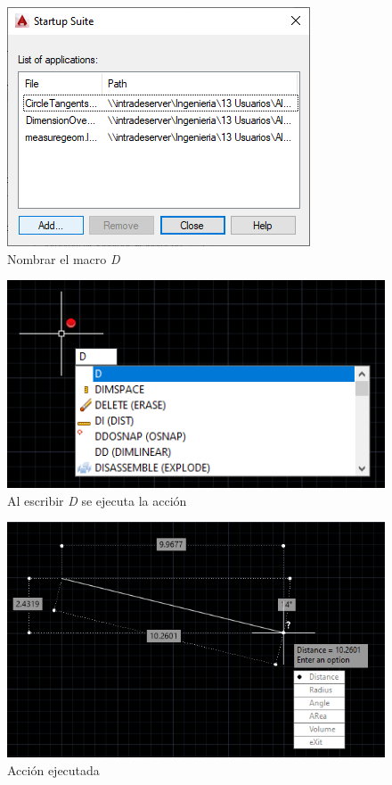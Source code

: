 \documentclass{report}
\begin{document}
\begin{figure}[H]
	\centering
	\includegraphics[width=0.75\linewidth, height=0.45\textheight,keepaspectratio]{Imagenes/autocad_measuregeom03}
	\caption{Nombrar el macro \emph{D}}
	\label{fig:autocadmeasuregeom03}
\end{figure}

\begin{figure}[H]
	\centering
	\includegraphics[width=0.95\linewidth, height=0.5\textheight,keepaspectratio]{Imagenes/autocad_measuregeom04}
	\caption{Al escribir \emph{D} se ejecuta la acción}
	\label{fig:autocadmeasuregeom04}
\end{figure}

\begin{figure}[H]
	\centering
	\includegraphics[width=0.95\linewidth, height=0.5\textheight,keepaspectratio]{Imagenes/autocad_measuregeom05}
	\caption{Acción ejecutada}
	\label{fig:autocadmeasuregeom05}
\end{figure}
\end{document}
